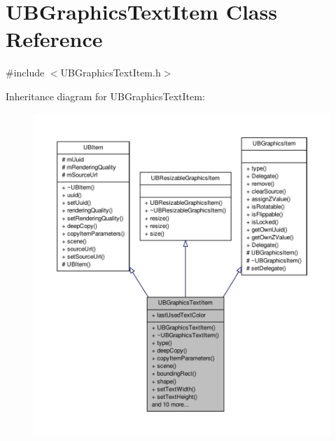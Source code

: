 \hypertarget{class_u_b_graphics_text_item}{\section{U\-B\-Graphics\-Text\-Item Class Reference}
\label{da/d65/class_u_b_graphics_text_item}
}


{\ttfamily \#include $<$U\-B\-Graphics\-Text\-Item.\-h$>$}



Inheritance diagram for U\-B\-Graphics\-Text\-Item\-:
\nopagebreak
\begin{figure}[H]
\begin{center}
\leavevmode
\includegraphics[width=350pt]{dc/da9/class_u_b_graphics_text_item__inherit__graph}
\end{center}
\end{figure}


